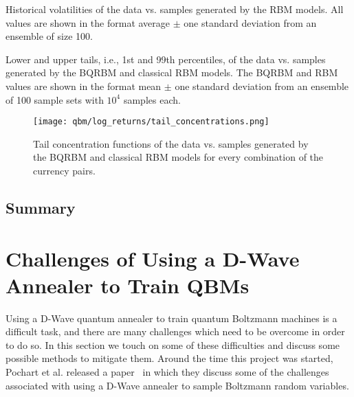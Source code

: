 \begin{table}[!htb]
    \centering
    \begin{adjustbox}{max width=\textwidth}
        
    \end{adjustbox}
    \caption{Historical volatilities of the data vs. samples generated by the RBM models. All values are shown in the format average \(\pm\) one standard deviation from an ensemble of size 100.}
    \label{tbl:qbm_volatilities}
\end{table}

\begin{table}[!htb]
    \centering
    \begin{adjustbox}{max width=\textwidth}
        
    \end{adjustbox}
    \caption{Lower and upper tails, i.e., 1st and 99th percentiles, of the data vs. samples generated by the BQRBM and classical RBM models. The BQRBM and RBM values are shown in the format mean \(\pm\) one standard deviation from an ensemble of 100 sample sets with \( 10^4 \) samples each.}
    \label{tbl:qbm_tails}
\end{table}

\begin{figure}[!htb]
    \begin{center}
        \texttt{[image: qbm/log\_returns/tail\_concentrations.png]}
    \end{center}
    \caption{Tail concentration functions of the data vs. samples generated by the BQRBM and classical RBM models for every combination of the currency pairs.}
    \label{fig:qbm_log_returns_tail_concentrations}
\end{figure}

\subsection{Summary}

\section{Challenges of Using a D-Wave Annealer to Train QBMs}
Using a D-Wave quantum annealer to train quantum Boltzmann machines is a difficult task, and there are many challenges which need to be overcome in order to do so.
In this section we touch on some of these difficulties and discuss some possible methods to mitigate them.
Around the time this project was started, Pochart et al. released a paper~\cite{pochart_2021} in which they discuss some of the challenges associated with using a D-Wave annealer to sample Boltzmann random variables.

